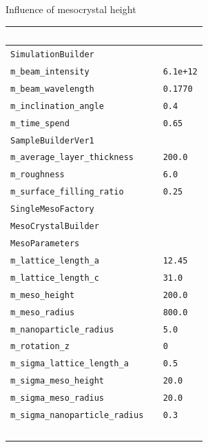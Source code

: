 \documentclass[landscape]{article}%
\begin{document}
%
\newpage%
Influence of mesocrystal height%
\vspace*{2cm}%
\newline%
%
\begin{minipage}[0.25\textwidth]{0.2\textwidth}%
\renewcommand{\arraystretch}{0.8}%
\begin{tabular}{l l}%
\hline%
\tiny{\texttt{}}&\tiny{\texttt{ }}\\%
\hline%
\tiny{\texttt{SimulationBuilder}}&\tiny{\texttt{ }}\\%
\tiny{\texttt{m\_beam\_intensity               }}&\tiny{\texttt{ 6.1e+12}}\\%
\tiny{\texttt{m\_beam\_wavelength              }}&\tiny{\texttt{ 0.1770}}\\%
\tiny{\texttt{m\_inclination\_angle            }}&\tiny{\texttt{ 0.4}}\\%
\tiny{\texttt{m\_time\_spend                   }}&\tiny{\texttt{ 0.65}}\\%
\hline%
\tiny{\texttt{SampleBuilderVer1}}&\tiny{\texttt{ }}\\%
\tiny{\texttt{m\_average\_layer\_thickness      }}&\tiny{\texttt{ 200.0}}\\%
\tiny{\texttt{m\_roughness                    }}&\tiny{\texttt{ 6.0}}\\%
\tiny{\texttt{m\_surface\_filling\_ratio        }}&\tiny{\texttt{ 0.25}}\\%
\hline%
\tiny{\texttt{SingleMesoFactory}}&\tiny{\texttt{ }}\\%
\hline%
\tiny{\texttt{MesoCrystalBuilder}}&\tiny{\texttt{ }}\\%
\hline%
\tiny{\texttt{MesoParameters}}&\tiny{\texttt{ }}\\%
\tiny{\texttt{m\_lattice\_length\_a             }}&\tiny{\texttt{ 12.45}}\\%
\tiny{\texttt{m\_lattice\_length\_c             }}&\tiny{\texttt{ 31.0}}\\%
\tiny{\texttt{m\_meso\_height                  }}&\tiny{\texttt{ 200.0}}\\%
\tiny{\texttt{m\_meso\_radius                  }}&\tiny{\texttt{ 800.0}}\\%
\tiny{\texttt{m\_nanoparticle\_radius          }}&\tiny{\texttt{ 5.0}}\\%
\tiny{\texttt{m\_rotation\_z                   }}&\tiny{\texttt{ 0}}\\%
\tiny{\texttt{m\_sigma\_lattice\_length\_a       }}&\tiny{\texttt{ 0.5}}\\%
\tiny{\texttt{m\_sigma\_meso\_height            }}&\tiny{\texttt{ 20.0}}\\%
\tiny{\texttt{m\_sigma\_meso\_radius            }}&\tiny{\texttt{ 20.0}}\\%
\tiny{\texttt{m\_sigma\_nanoparticle\_radius    }}&\tiny{\texttt{ 0.3}}\\%
\hline%
\tiny{\texttt{}}&\tiny{\texttt{ }}\\%
\end{tabular}%
\newline%
%
\end{minipage}%
\end{document}
